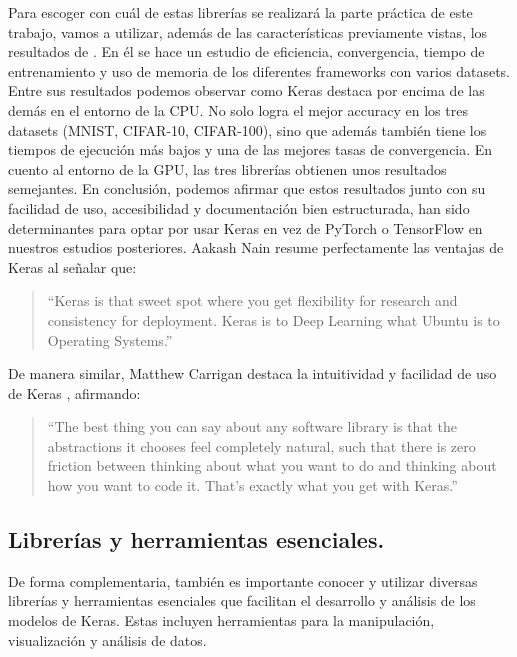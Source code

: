 Para escoger con cuál de estas librerías se realizará la parte práctica de este trabajo, vamos a utilizar, además de las características previamente vistas, los resultados de \citep{mahmoud2019dlbench}. En él se hace un estudio de eficiencia, convergencia, tiempo de entrenamiento y uso de memoria de los diferentes frameworks con varios datasets. Entre sus resultados podemos observar como Keras destaca por encima de las demás en el entorno de la CPU. No solo logra el mejor accuracy en los tres datasets (MNIST, CIFAR-10, CIFAR-100), sino que además también tiene los tiempos de ejecución más bajos y una de las mejores tasas de convergencia. En cuento al entorno de la GPU, las tres librerías obtienen unos resultados semejantes. En conclusión, podemos afirmar que estos resultados junto con su facilidad de uso, accesibilidad y documentación bien estructurada, han sido determinantes para optar por usar Keras en vez de PyTorch o TensorFlow en nuestros estudios posteriores. Aakash Nain resume perfectamente las ventajas de Keras \citep{keraswebsite2} al señalar que:

\begin{quote} 
``Keras is that sweet spot where you get flexibility for research and consistency for deployment. Keras is to Deep Learning what Ubuntu is to Operating Systems.'' 
\end{quote}

De manera similar, Matthew Carrigan destaca la intuitividad y facilidad de uso de Keras \citep{keraswebsite}, afirmando:

\begin{quote}
``The best thing you can say about any software library is that the abstractions it chooses feel completely natural, such that there is zero friction between thinking about what you want to do and thinking about how you want to code it. That's exactly what you get with Keras.''
\end{quote}


\subsection{Librerías y herramientas esenciales.} \label{sec:2.3.2}

De forma complementaria, también es importante conocer y utilizar diversas librerías y herramientas esenciales que facilitan el desarrollo y análisis de los modelos de Keras. Estas incluyen herramientas para la manipulación, visualización y análisis de datos.

